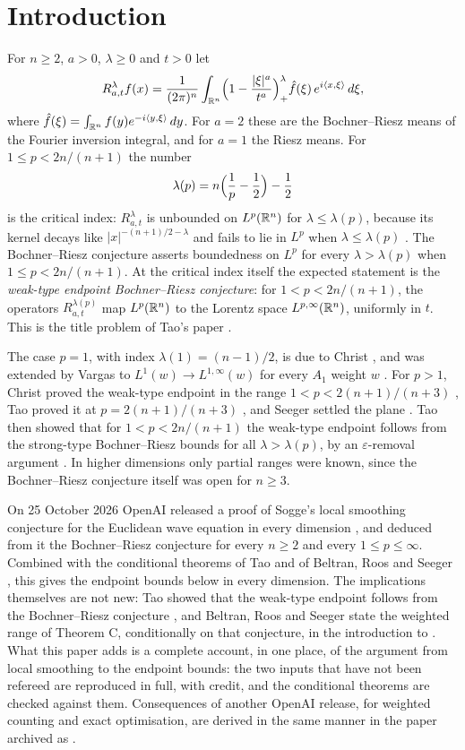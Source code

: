 \section{Introduction}\label{sec:intro}

For $n\ge 2$, $a>0$, $\lambda\ge 0$ and $t>0$ let
\[
R^\lambda_{a,t}f(x)=\frac{1}{(2\pi)^n}\int_{\mathbb{R}^n}\Bigl(1-\frac{|\xi|^a}{t^a}\Bigr)_+^\lambda
\hat f(\xi)\,e^{i\langle x,\xi\rangle}\,d\xi ,
\]
where $\hat f(\xi)=\int_{\mathbb{R}^n}f(y)e^{-i\langle y,\xi\rangle}\,dy$.
For $a=2$ these are the Bochner--Riesz means of the Fourier inversion integral, and for
$a=1$ the Riesz means. For $1\le p<2n/(n+1)$ the number
\begin{equation}\label{eq:critical}
\lambda(p)=n\Bigl(\frac1p-\frac12\Bigr)-\frac12
\end{equation}
is the critical index: $R^\lambda_{a,t}$ is unbounded on $L^p(\mathbb{R}^n)$ for $\lambda\le\lambda(p)$,
because its kernel decays like $|x|^{-(n+1)/2-\lambda}$ and fails to lie in $L^p$ when
$\lambda\le\lambda(p)$ \cite{Ste93}. The Bochner--Riesz conjecture asserts boundedness on $L^p$ for
every $\lambda>\lambda(p)$ when $1\le p<2n/(n+1)$. At the critical index itself the
expected statement is the \emph{weak-type endpoint Bochner--Riesz conjecture}: for
$1<p<2n/(n+1)$, the operators $R^{\lambda(p)}_{a,t}$ map $L^p(\mathbb{R}^n)$ to the Lorentz space
$L^{p,\infty}(\mathbb{R}^n)$, uniformly in $t$. This is the title problem of Tao's paper \cite{Tao98}.

The case $p=1$, with index $\lambda(1)=(n-1)/2$, is due to Christ \cite{Chr88}, and was
extended by Vargas to $L^1(w)\to L^{1,\infty}(w)$ for every $A_1$ weight $w$ \cite{Var96}.
For $p>1$, Christ proved the weak-type endpoint in the range $1<p<2(n+1)/(n+3)$
\cite{Chr87}, Tao proved it at $p=2(n+1)/(n+3)$ \cite{Tao98}, and Seeger settled the plane \cite{See96}.
Tao then showed that for $1<p<2n/(n+1)$ the weak-type endpoint follows from the strong-type
Bochner--Riesz bounds for all $\lambda>\lambda(p)$, by an $\varepsilon$-removal argument
\cite{Tao98}. In higher dimensions only partial ranges were known, since the Bochner--Riesz
conjecture itself was open for $n\ge 3$.

On 25 October 2026 OpenAI released a proof of Sogge's local smoothing conjecture for the
Euclidean wave equation in every dimension \cite{OAI26}, and deduced from it the
Bochner--Riesz conjecture for every $n\ge 2$ and every $1\le p\le\infty$. Combined with the
conditional theorems of Tao \cite{Tao98} and of Beltran, Roos and Seeger \cite{BRS25,BRS23},
this gives the endpoint bounds below in every dimension. The implications themselves are not
new: Tao showed that the weak-type endpoint follows from the Bochner--Riesz conjecture
\cite{Tao98}, and Beltran, Roos and Seeger state the weighted range of Theorem C, conditionally on
that conjecture, in the introduction to \cite{BRS25}. What this paper adds is a complete account,
in one place, of the argument from local smoothing to the endpoint bounds: the two inputs that
have not been refereed are reproduced in full, with credit, and the conditional theorems are
checked against them. Consequences of another OpenAI release, for weighted counting and exact
optimisation, are derived in the same manner in the paper archived as \cite{Bha26b}.

